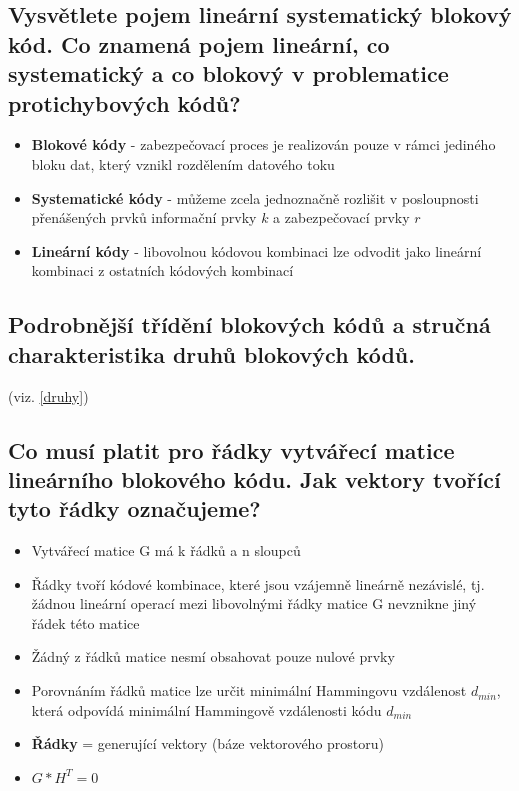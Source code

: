 \subsection{Vysvětlete pojem lineární systematický blokový kód. Co znamená pojem lineární, co systematický a co blokový v problematice protichybových kódů?}
\begin{itemize}
    \item \textbf{Blokové kódy} - zabezpečovací proces je realizován pouze v rámci jediného bloku dat, který vznikl rozdělením datového toku
    \item \textbf{Systematické kódy} - můžeme zcela jednoznačně rozlišit v posloupnosti přenášených prvků informační prvky $k$ a zabezpečovací prvky $r$
    \item \textbf{Lineární kódy} - libovolnou kódovou kombinaci lze odvodit jako lineární kombinaci z ostatních kódových kombinací
\end{itemize}

\subsection{Podrobnější třídění blokových kódů a stručná charakteristika druhů blokových kódů.}
(viz. \ref{druhy})

\subsection{Co musí platit pro řádky vytvářecí matice lineárního blokového kódu. Jak vektory tvořící tyto řádky označujeme?}
\begin{itemize}
    \item Vytvářecí matice G má k řádků a n sloupců
    \item Řádky tvoří kódové kombinace, které jsou vzájemně lineárně nezávislé, tj. žádnou lineární operací mezi libovolnými řádky matice G nevznikne jiný řádek této matice
    \item Žádný z řádků matice nesmí obsahovat pouze nulové prvky
    \item Porovnáním řádků matice lze určit minimální Hammingovu vzdálenost $d_{min}$, která odpovídá minimální Hammingově vzdálenosti kódu $d_{min}$
    \item \textbf{Řádky} = generující vektory (báze vektorového prostoru)
    \item $G*H^{T}=0$
\end{itemize}

